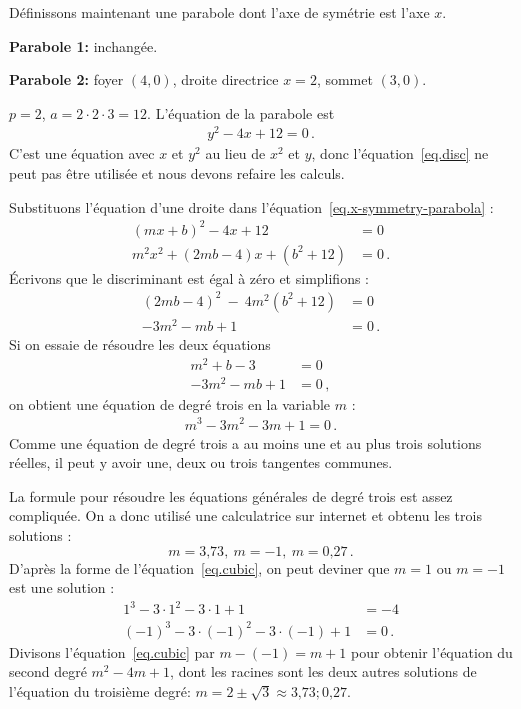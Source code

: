 \begin{example}\mbox{}

\noindent Définissons maintenant une parabole dont l'axe de symétrie est l'axe $x$.

\noindent\textbf{Parabole 1:} inchangée.

\noindent\textbf{Parabole 2:} foyer $(4,0)$, droite directrice $x=2$, sommet $(3,0)$.

\noindent{}$p=2$, $a=2\cdot 2\cdot 3=12$. L'équation de la parabole est 
\begin{align}
y^2-4x+12 = 0\,.\label{eq.x-symmetry-parabola}
\end{align}
C'est une équation avec $x$ et $y^2$ au lieu de $x^2$ et $y$, donc l'équation~\ref{eq.disc} ne peut pas être utilisée et nous devons refaire les calculs.

Substituons l'équation d'une droite dans l'équation~\ref{eq.x-symmetry-parabola} :
\begin{align*}
(mx+b)^2-4x+12&=0\\
m^2x^2+(2mb-4)x+(b^2+12)&=0\,.
\end{align*}
\'Ecrivons que le discriminant est égal à zéro et simplifions :
\begin{align*}
(2mb-4)^2\:-\:4m^2(b^2+12)&=0\\
-3m^2-mb+1&=0\,.
\end{align*}
Si on essaie de résoudre les deux équations 
\begin{align*}
m^2+b-3&=0\\
-3m^2-mb+1&=0\,,
\end{align*}
on obtient une équation de degré trois en la variable $m$ :
\begin{align}
m^3-3m^2-3m+1=0\,.\label{eq.cubic}
\end{align}
Comme une équation de degré trois a au moins une et au plus trois solutions réelles, il peut y avoir une, deux ou trois tangentes communes.

La formule pour résoudre les équations générales de degré trois  est assez compliquée. On a donc utilisé une calculatrice sur internet et obtenu les trois solutions :
\[m=\mbox{3,73},\:m=-1,\:m=\mbox{0,27}\,.\]
D'après la forme de l'équation~\ref{eq.cubic}, on peut deviner que $m=1$ ou $m=-1$ est une solution :
\begin{align*}
1^3-3\cdot 1^2-3\cdot 1+1&=-4\\
(-1)^3-3\cdot (-1)^2-3\cdot(-1)+1&=0\,.
\end{align*}
Divisons l'équation~\ref{eq.cubic} par $m-(-1)=m+1$ pour obtenir l'équation du second degré $m^2-4m+1$,  dont les racines sont les deux autres solutions de l'équation du troisième degré:  $m=2\pm\sqrt{3}\approx \mbox{3,73}; \mbox{0,27}$.
\end{example}

